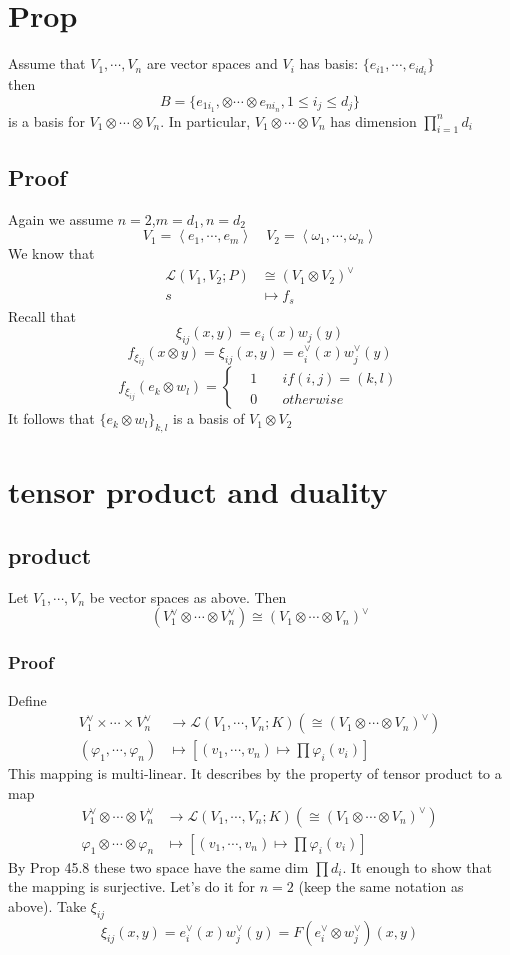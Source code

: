 \documentclass{book}
\begin{document}
\section{Prop}
Assume that $V_1,\cdots,V_n$ are vector spaces and $V_i$ has basis: $\{e_{i1},\cdots,e_{id_i}\}$\\then 
$$B=\{e_{1i_1},\otimes\cdots\otimes e_{ni_n},1\leq i_j\leq d_j\}$$
is a basis for $V_1\otimes\cdots\otimes V_n$. In particular, $V_1\otimes\cdots\otimes V_n$ has dimension $\prod\limits_{i=1}^nd_i$
\subsection*{Proof}
Again we assume $n=2$,$m=d_1, n=d_2$
$$V_1=\left<e_1,\cdots,e_m\right>\quad V_2=\left<\omega_1,\cdots,\omega_n\right>$$
We know that $$
\begin{aligned}
    \mathscr{L}(V_1,V_2;P) &\cong (V_1\otimes V_2)^\vee\\
    s&\mapsto f_s
\end{aligned}
$$
Recall that
$$\xi_{ij}(x,y)=e_i(x)w_j(y)$$
$$f_{\xi_{ij}}(x\otimes y)=\xi_{ij}(x,y)=e_i^\vee(x)w_j^\vee(y)$$
$$f_{\xi_{ij}}(e_k\otimes w_l)=\left\{\begin{aligned}
    &1\quad &if (i,j)=(k,l)\\ &0\quad &otherwise
\end{aligned}\right.$$
It follows that $\{e_k\otimes w_l\}_{k,l}$ is a basis of $V_1\otimes V_2$
\section{tensor product and duality}
\subsection{product}
Let $V_1,\cdots,V_n$ be vector spaces as above. Then $$(V_1^\vee\otimes\cdots\otimes V_n^\vee)\cong(V_1\otimes\cdots\otimes V_n)^\vee$$
\subsubsection*{Proof}
Define
$$\begin{aligned}
    V_1^\vee\times\cdots\times V_n^\vee &\rightarrow \mathscr{L}(V_1,\cdots,V_n;K)(\cong(V_1\otimes\cdots\otimes V_n)^\vee)\\
    (\varphi_1,\cdots,\varphi_n) &\mapsto [(v_1,\cdots,v_n)\mapsto \prod \varphi_i(v_i)]
\end{aligned}$$
This mapping is multi-linear. It describes by the property of tensor product to a map
$$\begin{aligned}
    V_1^\vee\otimes\cdots\otimes V_n^\vee &\rightarrow \mathscr{L}(V_1,\cdots,V_n;K)(\cong(V_1\otimes\cdots\otimes V_n)^\vee)\\
    \varphi_1\otimes\cdots\otimes\varphi_n &\mapsto [(v_1,\cdots,v_n)\mapsto \prod \varphi_i(v_i)]
\end{aligned}$$
By Prop 45.8 these two space have the same dim $\prod d_i$. It enough to show that the mapping is surjective. Let's do it for $n=2$ (keep the same notation as above). Take $\xi_{ij}$
$$\xi_{ij}(x,y)=e_i^\vee(x)w_j^\vee(y)=F(e_i^\vee\otimes w_j^\vee)(x,y)$$\
\end{document}
